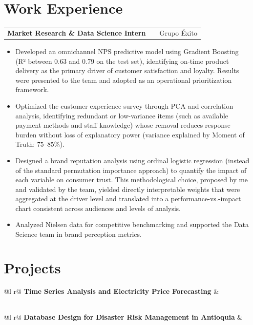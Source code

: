 \documentclass[a4paper, 10pt]{article}
\makeatletter
\newenvironment{joblong}[2]
    {
    \begin{tabularx}{\linewidth}{@{}l X r@{}}
    \textbf{#1} & \hfill &  #2 \\[3pt]
    \end{tabularx}
    \begin{minipage}[t]{\linewidth}
    \begin{itemize}[nosep,after=\strut, leftmargin=1em, itemsep=5pt,label=--]
    }
    {
    \end{itemize}
    \end{minipage}    
    }
\makeatother
\begin{document}
\section{Work Experience}

\begin{joblong}{Market Research \& Data Science Intern}{Grupo Éxito}

\item Developed an omnichannel NPS predictive model using Gradient Boosting (R² between 0.63 and 0.79 on the test set), identifying on-time product delivery as the primary driver of customer satisfaction and loyalty. Results were presented to the team and adopted as an operational prioritization framework.
\item Optimized the customer experience survey through PCA and correlation analysis, identifying redundant or low-variance items (such as available payment methods and staff knowledge) whose removal reduces response burden without loss of explanatory power (variance explained by Moment of Truth: $75$--$85\%$).
\item Designed a brand reputation analysis using ordinal logistic regression (instead of the standard permutation importance approach) to quantify the impact of each variable on consumer trust. This methodological choice, proposed by me and validated by the team, yielded directly interpretable weights that were aggregated at the driver level and translated into a performance-vs.-impact chart consistent across audiences and levels of analysis.
\item Analyzed Nielsen data for competitive benchmarking and supported the Data Science team in brand perception metrics.
\end{joblong}
  
\section{Projects}

\begin{tabularx}{\linewidth}{ @{}l r@{} }
\textbf{Time Series Analysis and Electricity Price Forecasting} & \hfill \\[3.75pt]
  \\
\end{tabularx}

\begin{tabularx}{\linewidth}{ @{}l r@{} }
\textbf{Database Design for Disaster Risk Management in Antioquia} & \hfill \\[3.75pt]
  \\
\end{tabularx}
\end{document}
